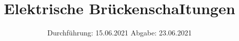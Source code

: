 

\subject{Versuch Nr.V302}
\title{Elektrische BrückenschaItungen}
\date{%
  Durchführung: 15.06.2021
  \hspace{3em}
  Abgabe: 23.06.2021
}



\maketitle
\thispagestyle{empty}
\tableofcontents
\newpage 








\nocite{*}

\printbibliography{}


